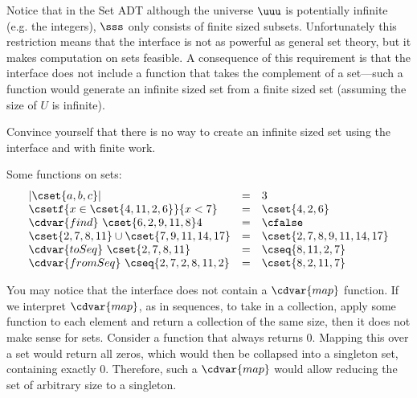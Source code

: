 

\begin{gram}
Notice that in the Set ADT although the universe $\uuu$ is potentially
infinite (e.g. the integers), $\sss$ only consists of finite sized
subsets.
%
Unfortunately this restriction
means that the interface is not as powerful as general set theory, but
it makes computation on sets feasible.  A consequence of this
requirement is that the interface does not include a function that
takes the complement of a set---such a function would generate an
infinite sized set from a finite sized set (assuming the size of $U$
is infinite).
\end{gram}

\begin{exercise}
Convince yourself that there is no way to create an infinite sized set
using the interface and with finite work.
\end{exercise}

\begin{example}
  Some functions on sets:
  \[
\begin{array}{lcl}
|\cset{a,b,c}| & = & 3\\
\csetf{x \in \cset{4,11,2,6}}{x < 7} & = &
\cset{4,2,6}\\
\cdvar{find}~\cset{6,2,9,11,8} 4  & = & \cfalse\\
\cset{2,7,8,11} \cup \cset{7,9,11,14,17} & = &
\cset{2,7,8,9,11,14,17}\\
\cdvar{toSeq}~\cset{2,7,8,11} & = & \cseq{8,11,2,7}\\
\cdvar{fromSeq}~\cseq{2,7,2,8,11,2} & = & \cset{8,2,11,7}
\end{array}
\]
\end{example}

\begin{remark}
You may notice that the interface does not
contain a $\cdvar{map}$ function.  If we interpret $\cdvar{map}$, as in sequences, to take in a collection, apply some
function to each element and return a collection of the same size,
then it does not make sense for sets.
Consider a function that always returns $0$.  Mapping this over a set would
return all zeros, which would then be collapsed into a singleton set, containing
exactly $0$.  Therefore, such a $\cdvar{map}$ would allow reducing the set of
arbitrary size to a singleton.
\end{remark}

